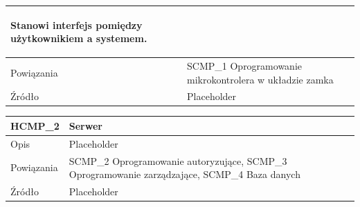 \begin{table}
\begin{subtable}[c]{\textwidth}
\begin{tabular}{|p{2cm}|p{12cm}|}
\begin{itemize}
                                                            Stanowi interfejs pomiędzy użytkownikiem a systemem.
                                                    \end{itemize}  \\
                            \hline \cellcolor[gray]{0.8} Powiązania   & SCMP\_1 Oprogramowanie mikrokontrolera w układzie zamka    \\
                            \hline \cellcolor[gray]{0.8} Źródło       & Placeholder    \\
                            \hline
                        \end{tabular}
                        \label{tbl:hcmp1}
                        \vspace{10mm}           
                    \end{subtable}
                \quad%
                    \begin{subtable}[c]{\textwidth}
                        \centering
                        \begin{tabular}{|p{2cm}|p{12cm}|}
                            \hline HCMP\_2      & \textbf{Serwer} \\
                            \hline \cellcolor[gray]{0.8} Opis         & Placeholder \\
                            \hline \cellcolor[gray]{0.8} Powiązania   & SCMP\_2 Oprogramowanie autoryzujące, SCMP\_3 Oprogramowanie zarządzające, SCMP\_4 Baza danych   \\
                            \hline \cellcolor[gray]{0.8} Źródło       & Placeholder    \\
                            \hline
                        \end{tabular}
                        \label{tbl:hcmp2}     
                    \end{subtable}                
                    \label{tbl:hw_comp}
                \end{table}

